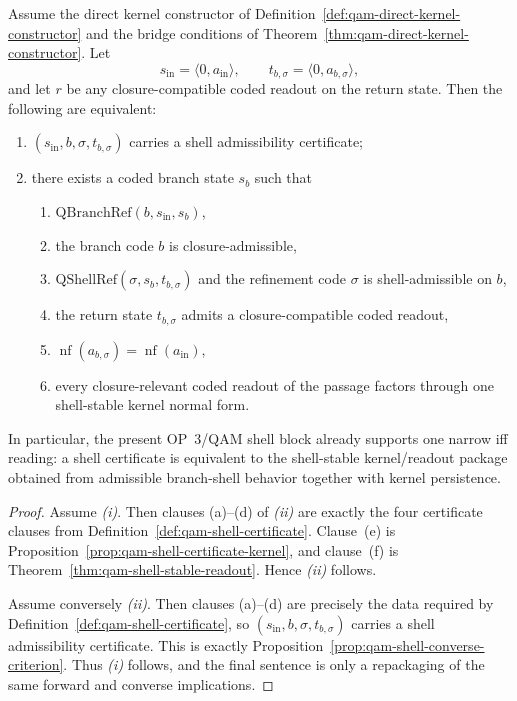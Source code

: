 \begin{theorem}\label{thm:qam-shell-iff-package}
Assume the direct kernel constructor of Definition~\ref{def:qam-direct-kernel-constructor} and the bridge conditions of Theorem~\ref{thm:qam-direct-kernel-constructor}. Let
\[
s_{\mathrm{in}}=\langle 0,a_{\mathrm{in}}\rangle,
\qquad
 t_{b,\sigma}=\langle 0,a_{b,\sigma}\rangle,
\]
and let $r$ be any closure-compatible coded readout on the return state. Then the following are equivalent:
\begin{enumerate}[leftmargin=2em,label=(\roman*)]
 \item $(s_{\mathrm{in}},b,\sigma,t_{b,\sigma})$ carries a shell admissibility certificate;
 \item there exists a coded branch state $s_b$ such that
 \begin{enumerate}[leftmargin=2em,label=(\alph*)]
 \item $\mathrm{QBranchRef}(b,s_{\mathrm{in}},s_b)$,
 \item the branch code $b$ is closure-admissible,
 \item $\mathrm{QShellRef}(\sigma,s_b,t_{b,\sigma})$ and the refinement code $\sigma$ is shell-admissible on $b$,
 \item the return state $t_{b,\sigma}$ admits a closure-compatible coded readout,
 \item $\operatorname{nf}(a_{b,\sigma})=\operatorname{nf}(a_{\mathrm{in}})$,
 \item every closure-relevant coded readout of the passage factors through one shell-stable kernel normal form.
 \end{enumerate}
\end{enumerate}
In particular, the present OP~3/QAM shell block already supports one narrow iff reading: a shell certificate is equivalent to the shell-stable kernel/readout package obtained from admissible branch-shell behavior together with kernel persistence.
\end{theorem}

\begin{proof}
Assume \emph{(i)}. Then clauses (a)--(d) of \emph{(ii)} are exactly the four certificate clauses from Definition~\ref{def:qam-shell-certificate}. Clause~(e) is Proposition~\ref{prop:qam-shell-certificate-kernel}, and clause~(f) is Theorem~\ref{thm:qam-shell-stable-readout}. Hence \emph{(ii)} follows.

Assume conversely \emph{(ii)}. Then clauses (a)--(d) are precisely the data required by Definition~\ref{def:qam-shell-certificate}, so $(s_{\mathrm{in}},b,\sigma,t_{b,\sigma})$ carries a shell admissibility certificate. This is exactly Proposition~\ref{prop:qam-shell-converse-criterion}. Thus \emph{(i)} follows, and the final sentence is only a repackaging of the same forward and converse implications.
\end{proof}

